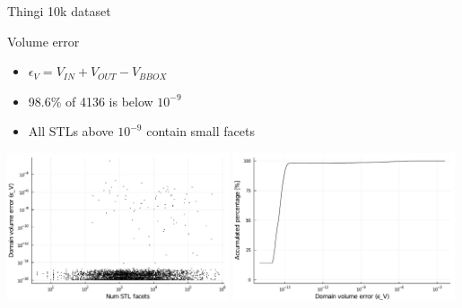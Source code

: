\documentclass{beamer}
\begin{document}
\begin{frame}{Thingi 10k dataset}

  \begin{block}{Volume error}
  \begin{itemize}
    \item
      $\epsilon_V = V_{IN} + V_{OUT} - V_{BBOX}$
    \item
      98.6\% of 4136 is below $10^{-9}$
    \item
      All STLs above $10^{-9}$ contain small facets
  \end{itemize}
  \end{block}

  \includegraphics[width=0.49\textwidth]{../analysis/plots/num_stl_facets_volume_error}
  \includegraphics[width=0.49\textwidth]{../analysis/plots/histogram_volume_error}
\end{frame}
\end{document}
